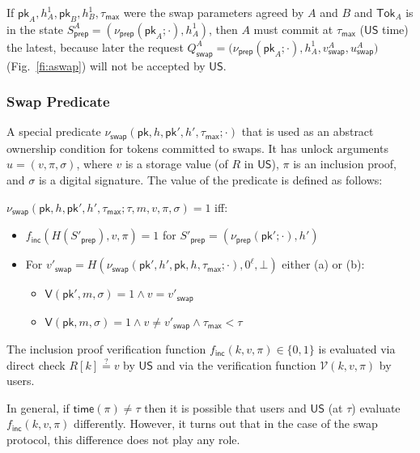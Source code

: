 \documentclass{article}
\newcommand{\sigver}[0]{\mathsf{V}}
\newcommand{\pubkey}[0]{\mathsf{pk}}
\newcommand{\unisrv}[0]{\mathsf{US}}
\begin{document}
If $\pubkey_A,h^1_A,\pubkey_B,h^1_B,\tau_\mathsf{max}$ were the swap parameters agreed by $A$ and $B$ and $\mathsf{Tok}_A$ is in the state $S^A_\mathsf{prep}=(\nu_\mathsf{prep}(\pubkey_A;\cdot),h^1_A)$, then $A$ must commit at $\tau_\mathsf{max}$ ($\unisrv$ time) the latest, because later the request $Q^A_\mathsf{swap}=(\nu_\mathsf{prep}$$(\pubkey_A;\cdot),h^1_A,v^A_\mathsf{swap},u^A_\mathsf{swap})$ (Fig.~\ref{fi:aswap}) will not be accepted by $\unisrv$.


\subsubsection{Swap Predicate}

A special predicate $\nu_\mathsf{swap}(\pubkey,h,\pubkey',h',\tau_\mathsf{max};\cdot)$ that is used as an abstract ownership condition for tokens committed to swaps.
It has unlock arguments $u=(v,\pi,\sigma)$, where $v$ is a storage value (of $R$ in $\unisrv$), $\pi$ is an inclusion proof, and $\sigma$ is a digital signature.
The value of the predicate is defined as follows:\medskip

\noindent $\nu_\mathsf{swap}(\pubkey,h,\pubkey',h',\tau_\mathsf{max};\tau,m,v,\pi,\sigma) = 1$ iff:
\begin{itemize}
\item[1.] $f_\mathsf{inc}(H(S'_\mathsf{prep}),v,\pi)=1$ for $S'_\mathsf{prep}=(\nu_\mathsf{prep}(\pubkey';\cdot),h')$
\item[2.] For $v'_\mathsf{swap}=H(\nu_\mathsf{swap}(\pubkey',h',\pubkey,h,\tau_\mathsf{max};\cdot),0^\ell,\bot)$ either (a) or (b):
    \begin{itemize}
    \item[(a)] $\sigver(\pubkey',m,\sigma)\!=\!1 \wedge v=v'_\mathsf{swap}$
    \item[(b)] $\sigver(\pubkey,m,\sigma)\!=\!1 \wedge v\neq v'_\mathsf{swap}
    \wedge \tau_\mathsf{max}<\tau$
    \end{itemize}
\end{itemize}
\medskip

\noindent The inclusion proof verification function $f_\mathsf{inc}(k,v,\pi)\in\{0,1\}$ is evaluated via direct check $R[k]\stackrel{\mbox{?}}{=} v$ by $\unisrv$ and via the verification function $\mathcal{V}(k,v,\pi)$ by users.

In general, if $\mathsf{time}(\pi) \neq \tau$ then it is possible that users and $\unisrv$ (at $\tau$) evaluate $f_\mathsf{inc}(k,v,\pi)$ differently. However, it turns out that in the case of the swap protocol, this difference does not play any role.
\end{document}
